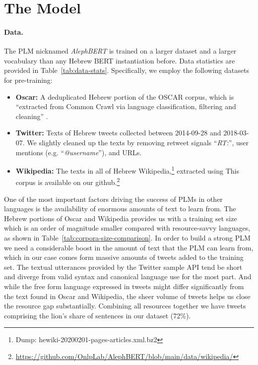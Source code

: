 \documentclass[11pt,a4paper]{article}
\begin{document}
\section{The Model}

\paragraph{Data.}
The PLM nicknamed {\em AlephBERT} is trained on a larger dataset and a larger vocabulary than any Hebrew BERT instantiation before. Data statistics are provided in Table~\ref{tab:data-stats}.
 Specifically, we employ the following datasets for pre-training:

\begin{itemize}
    \item {\bf Oscar:}  A deduplicated Hebrew portion of the OSCAR\- corpus, which is ``extracted from Common Crawl via language classification, filtering and cleaning'' \cite{ortiz-suarez-etal-2020-monolingual}.
    \item {\bf Twitter:} Texts of Hebrew tweets collected between 2014-09-28 and 2018-03-07.  We slightly cleaned up the texts by removing  retweet signals ``{\em RT:}'', user mentions (e.g. ``{\em @username}''), and URLs.
    \item {\bf Wikipedia:} The texts in all of  Hebrew Wikipedia,\footnote{Dump: hewiki-20200201-pages-articles.xml.bz2} extracted using \citet{Wikiextractor2015} This corpus is available on our github.\footnote{\url{https://github.com/OnlpLab/AlephBERT/blob/main/data/wikipedia/}}
\end{itemize}
One of the most important factors driving the success of PLMs in other languages is the availability of enormous amounts of text to learn from.
The Hebrew portions of Oscar and Wikipedia provides us with a training set size which is an order of magnitude smaller compared with  resource-savvy languages, 
as shown in Table~\ref{tab:corpora-size-comparison}.
In order to build a strong PLM we need a considerable boost in the amount of text that the PLM can learn from, which in our case comes form massive amounts of tweets added to the training set.
The textual utterances provided by the Twitter sample API tend be short and diverge from valid syntax and canonical language use for the most part.
And while the free form language expressed in tweets might differ significantly from the text found in Oscar and Wikipedia, the sheer volume of tweets helps us close the resource gap substantially.
Combining all resources together we have tweets comprising the lion's share of sentences in our dataset (72\%).
\end{document}
